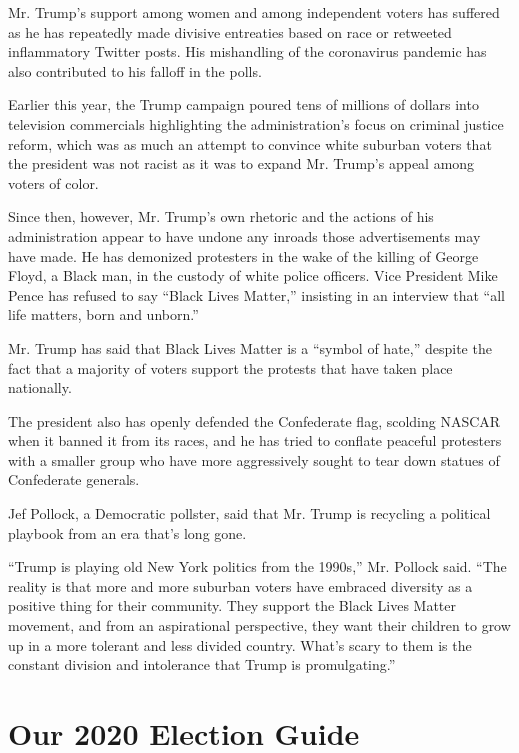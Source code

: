 Mr. Trump's support among women and among independent voters has
suffered as he has repeatedly made divisive entreaties based on race or
retweeted inflammatory Twitter posts. His mishandling of the coronavirus
pandemic has also contributed to his falloff in the polls.

Earlier this year, the Trump campaign poured tens of millions of dollars
into television commercials highlighting the administration's focus on
criminal justice reform, which was as much an attempt to convince white
suburban voters that the president was not racist as it was to expand
Mr. Trump's appeal among voters of color.

Since then, however, Mr. Trump's own rhetoric and the actions of his
administration appear to have undone any inroads those advertisements
may have made. He has demonized protesters in the wake of the killing of
George Floyd, a Black man, in the custody of white police officers. Vice
President Mike Pence has refused to say ``Black Lives Matter,''
insisting in an interview that ``all life matters, born and unborn.''

Mr. Trump has said that Black Lives Matter is a ``symbol of hate,''
despite the fact that a majority of voters support the protests that
have taken place nationally.

The president also has openly defended the Confederate flag, scolding
NASCAR when it banned it from its races, and he has tried to conflate
peaceful protesters with a smaller group who have more aggressively
sought to tear down statues of Confederate generals.

Jef Pollock, a Democratic pollster, said that Mr. Trump is recycling a
political playbook from an era that's long gone.

``Trump is playing old New York politics from the 1990s,'' Mr. Pollock
said. ``The reality is that more and more suburban voters have embraced
diversity as a positive thing for their community. They support the
Black Lives Matter movement, and from an aspirational perspective, they
want their children to grow up in a more tolerant and less divided
country. What's scary to them is the constant division and intolerance
that Trump is promulgating.''

\hypertarget{our-2020-election-guide}{%
\section{Our 2020 Election Guide}\label{our-2020-election-guide}}

